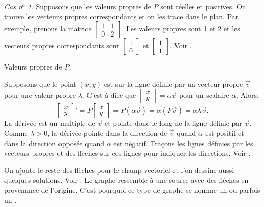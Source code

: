\emph{Cas n$^o$ 1.}  Supposons que les valeurs propres de $P$ sont réelles et positives. On trouve les vecteurs propres correspondants et on les trace dans le plan. Par exemple, prenons la matrice $\left[ \begin{smallmatrix} 1 & 1 \\ 0 & 2 \end{smallmatrix}
\right]$.
Les valeurs propres sont 1 et 2 et les vecteurs propres correspondants sont
$\left[ \begin{smallmatrix} 1 \\ 0 \end{smallmatrix} \right]$ et
$\left[ \begin{smallmatrix} 1 \\ 1 \end{smallmatrix} \right]$. Voir
.

\begin{mywrapfig}{3.25in}
\capstart
{}
\caption{Valeurs propres de $P$.\label{pln:source-eigfig}}
\end{mywrapfig}

Supposons que le point $(x,y)$ est sur la ligne définie par un vecteur propre
$\vec{v}$ pour une valeur propre $\lambda$.
C’est-à-dire que
$\left[ \begin{smallmatrix} x \\ y \end{smallmatrix} \right] = \alpha \vec{v}$
pour un scalaire $\alpha$.
Alors, 
\begin{equation*}
\begin{bmatrix} x \\ y \end{bmatrix} '
=
P \begin{bmatrix} x \\ y \end{bmatrix}
=
P ( \alpha \vec{v} ) =  \alpha ( P \vec{v} )
= \alpha \lambda \vec{v} .
\end{equation*}
La dérivée est un multiple de $\vec{v}$ et pointe donc le long de la ligne définie par $\vec{v}$.  Comme $\lambda > 0$, la dérivée pointe dans la direction de $\vec{v}$ quand $\alpha$ est positif et dans la direction opposée quand $\alpha$ est négatif. Traçons les lignes définies par les vecteurs propres et des flèches sur ces lignes pour indiquer les directions.
Voir .

On ajoute le reste des flèches pour le champ vectoriel et l'on dessine aussi quelques solutions. Voir
.
Le graphe ressemble à une source avec des flèches en provenance de l’origine. C’est pourquoi ce type de graphe se nomme un \emph{} ou parfois un \emph{}.


